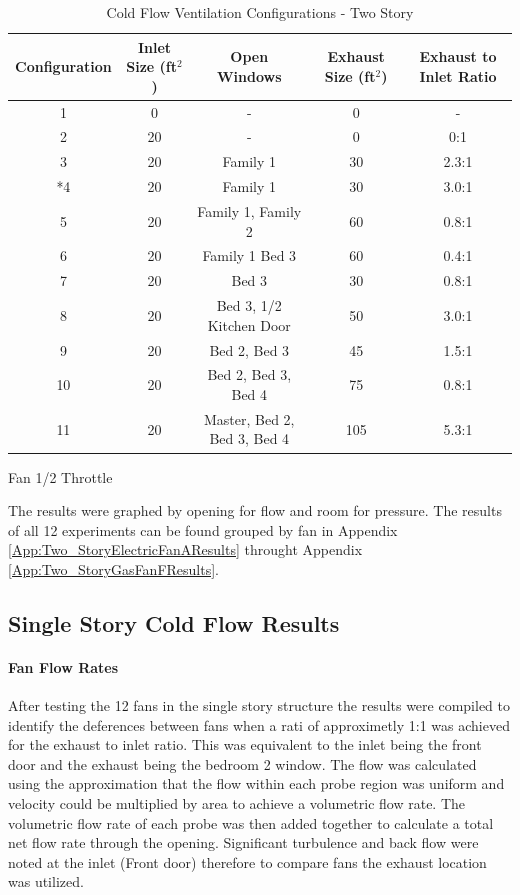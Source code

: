 \documentclass{article}
\begin{document}
\begin{table} [H]
	\caption{Cold Flow Ventilation Configurations - Two Story}
	\begin{tabular}{|c|c|c|c|c|}
		\hline
		Configuration & Inlet Size (ft$^2$) & Open Windows & Exhaust Size (ft$^2$) & Exhaust to Inlet Ratio \\ \hline \hline
		1 & 0 & - & 0 & - \\ \hline
		2 & 20 & - & 0 & 0:1 \\ \hline
		3 & 20 & Family 1 & 30 & 2.3:1 \\ \hline
		*4 & 20 & Family 1 & 30 & 3.0:1 \\ \hline
		5 & 20 & Family 1, Family 2 & 60 & 0.8:1 \\ \hline
		6 & 20 & Family 1 Bed 3 & 60 & 0.4:1 \\ \hline
		7 & 20 & Bed 3 & 30 & 0.8:1 \\ \hline
		8 & 20 & Bed 3, 1/2 Kitchen Door & 50 & 3.0:1 \\ \hline
		9 & 20 & Bed 2, Bed 3 & 45 & 1.5:1 \\ \hline
		10 & 20 & Bed 2, Bed 3, Bed 4 & 75 & 0.8:1 \\ \hline
		11 & 20 & Master, Bed 2, Bed 3, Bed 4 & 105 & 5.3:1 \\ \hline
	\end{tabular}
	\begin{tablenotes}
	\item *Fan 1/2 Throttle
	\end{tablenotes}
	\label{tab:ColdFlowConfig_TwoStory}
\end{table}

The results were graphed by opening for flow and room for pressure. The results of all 12 experiments can be found grouped by fan in Appendix \ref{App:Two_StoryElectricFanAResults} throught Appendix \ref{App:Two_StoryGasFanFResults}. 

\subsection{Single Story Cold Flow Results}

\paragraph{Fan Flow Rates} \mbox{}

After testing the 12 fans in the single story structure the results were compiled to identify the deferences between fans when a rati of approximetly 1:1 was achieved for the exhaust to inlet ratio. This was equivalent to the inlet being the front door and the exhaust being the bedroom 2 window.  The flow was calculated using the approximation that the flow within each probe region was uniform and velocity could be multiplied by area to achieve a volumetric flow rate. The volumetric flow rate of each probe was then added together to calculate a total net flow rate through the opening. Significant turbulence and back flow were noted at the inlet (Front door) therefore to compare fans the exhaust location was utilized. 
\end{document}

